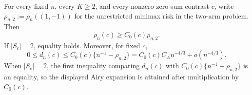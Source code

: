 For every fixed \(n\), every \(K\ge 2\), and every nonzero zero-sum contrast \(c\), write \(\rho_{n,2}:=\rho_n((1,-1))\) for the unrestricted minimax risk in the two-arm problem. Then
\[
\rho_n(c)\ge C_0(c)\rho_{n,2}.
\]
If \(|S_c|=2\), equality holds. Moreover, for fixed \(c\),
\[
0\le d_n(c)\le C_0(c)\{n^{-1}-\rho_{n,2}\}
=C_0(c)C_A n^{-4/3}+o(n^{-4/3}).
\]
When \(|S_c|=2\), the first inequality comparing \(d_n(c)\) with \(C_0(c)\{n^{-1}-\rho_{n,2}\}\) is an equality, so the displayed Airy expansion is attained after multiplication by \(C_0(c)\).